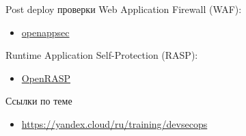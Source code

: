 \documentclass[aspectratio=169]{beamer}
\begin{document}
    \begin{frame}{Post deploy проверки}
        Web Application Firewall (WAF):
        \begin{itemize}
            \item \href{https://www.openappsec.io/}{openappsec}
        \end{itemize}

        Runtime Application Self-Protection (RASP):
        \begin{itemize}
            \item \href{https://github.com/baidu/openrasp}{OpenRASP}
        \end{itemize}
    \end{frame}

    \begin{frame}{Ссылки по теме}
        \begin{itemize}
            \item \url{https://yandex.cloud/ru/training/devsecops}
        \end{itemize}
    \end{frame}
\end{document}
